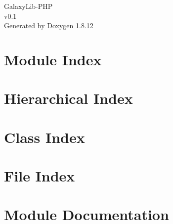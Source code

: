 \documentclass[twoside]{book}
\newcommand{\+}{\discretionary{\mbox{\scriptsize$\hookleftarrow$}}{}{}}
\newcommand{\clearemptydoublepage}{%
  \newpage{\pagestyle{empty}\cleardoublepage}%
}
\begin{document}
\hypersetup{pageanchor=false,
             bookmarksnumbered=true,
             pdfencoding=unicode
            }
\begin{titlepage}
\vspace*{7cm}
\begin{center}%
{\Large Galaxy\+Lib-\/\+P\+HP \\[1ex]\large v0.\+1 }\\
\vspace*{1cm}
{\large Generated by Doxygen 1.8.12}\\
\end{center}
\end{titlepage}
\clearemptydoublepage
{}
\tableofcontents
\clearemptydoublepage
{}
\hypersetup{pageanchor=true}

\chapter{Module Index}

\chapter{Hierarchical Index}

\chapter{Class Index}

\chapter{File Index}

\chapter{Module Documentation}





















\end{document}
